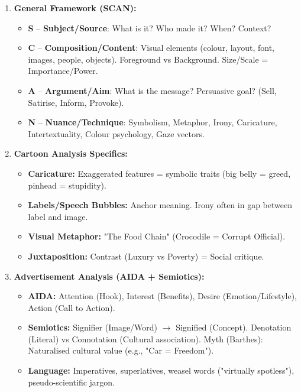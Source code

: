 \documentclass[11pt]{article}
\newcommand{\cle}[1]{{\popxbold\color{popdark}#1}}
\begin{document}
\begin{methode}
\begin{enumerate}
    \item \textbf{General Framework (SCAN):}
    \begin{itemize}
        \item \textbf{S} -- \textbf{Subject/Source}: What is it? Who made it? When? Context?
        \item \textbf{C} -- \textbf{Composition/Content}: Visual elements (colour, layout, font, images, people, objects). \cle{Foreground vs Background}. \cle{Size/Scale} = Importance/Power.
        \item \textbf{A} -- \textbf{Argument/Aim}: What is the \cle{message}? \cle{Persuasive goal}? (Sell, Satirise, Inform, Provoke).
        \item \textbf{N} -- \textbf{Nuance/Technique}: \cle{Symbolism}, \cle{Metaphor}, \cle{Irony}, \cle{Caricature}, \cle{Intertextuality}, \cle{Colour psychology}, \cle{Gaze vectors}.
    \end{itemize}
    \item \textbf{Cartoon Analysis Specifics:}
    \begin{itemize}
        \item \textbf{Caricature:} Exaggerated features = symbolic traits (big belly = greed, pinhead = stupidity).
        \item \textbf{Labels/Speech Bubbles:} Anchor meaning. Irony often in gap between label and image.
        \item \textbf{Visual Metaphor:} "The Food Chain" (Crocodile = Corrupt Official).
        \item \textbf{Juxtaposition:} Contrast (Luxury vs Poverty) = Social critique.
    \end{itemize}
    \item \textbf{Advertisement Analysis (AIDA + Semiotics):}
    \begin{itemize}
        \item \textbf{AIDA:} \cle{Attention} (Hook), \cle{Interest} (Benefits), \cle{Desire} (Emotion/Lifestyle), \cle{Action} (Call to Action).
        \item \textbf{Semiotics:} \cle{Signifier} (Image/Word) $\rightarrow$ \cle{Signified} (Concept). \cle{Denotation} (Literal) vs \cle{Connotation} (Cultural association). \cle{Myth} (Barthes): Naturalised cultural value (e.g., "Car = Freedom").
        \item \textbf{Language:} Imperatives, superlatives, weasel words ("virtually spotless"), pseudo-scientific jargon.

\end{itemize}
\end{enumerate}
\end{methode}
\end{document}

